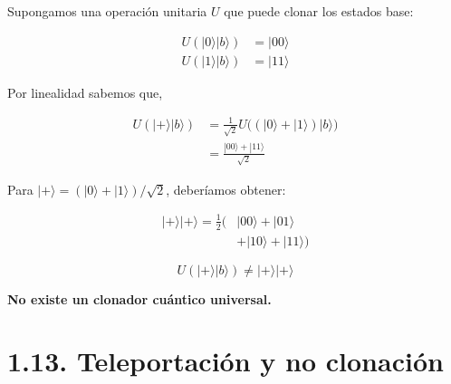\documentclass{afitdefense}
\begin{document}
\begin{Center}

\begin{minipage}[c]{0.47\textwidth}
\centering
\small
Supongamos una operación unitaria $U$
que puede clonar los estados base:

\[
\begin{aligned}
U(|0\rangle|b\rangle)&=|00\rangle\\
U(|1\rangle|b\rangle)&=|11\rangle
\end{aligned}
\]

\vspace{0.2cm}

Por linealidad sabemos que,
\vspace{-0.2cm}

\[
\begin{aligned}
U(|+\rangle|b\rangle)
&=\frac{1}{\sqrt{2}}
U\big((|0\rangle+|1\rangle)|b\rangle\big)\\
&=\frac{|00\rangle+|11\rangle}{\sqrt{2}}
\end{aligned}
\]

\end{minipage}
\hfill
\begin{minipage}[c]{0.49\textwidth}
\centering
\small
Para $|+\rangle=(|0\rangle+|1\rangle)/\sqrt{2}$,
deberíamos obtener:

\[
\begin{aligned}
|+\rangle|+\rangle
=\frac{1}{2}\big(
&|00\rangle+|01\rangle\\
&+|10\rangle+|11\rangle
\big)
\end{aligned}
\]


\[
\boxed{
U(|+\rangle|b\rangle)
\neq |+\rangle|+\rangle
}
\]

\medskip

\textbf{No existe un clonador
cuántico universal.}

\end{minipage}

\end{Center}


\section{1.13. Teleportación y no clonación}
\end{document}
